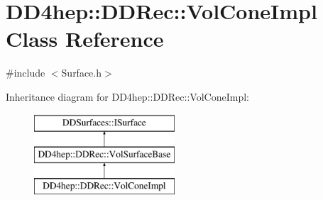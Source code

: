 \hypertarget{class_d_d4hep_1_1_d_d_rec_1_1_vol_cone_impl}{}\section{D\+D4hep\+:\+:D\+D\+Rec\+:\+:Vol\+Cone\+Impl Class Reference}
\label{class_d_d4hep_1_1_d_d_rec_1_1_vol_cone_impl}


{\ttfamily \#include $<$Surface.\+h$>$}

Inheritance diagram for D\+D4hep\+:\+:D\+D\+Rec\+:\+:Vol\+Cone\+Impl\+:\begin{figure}[H]
\begin{center}
\leavevmode
\includegraphics[height=3.000000cm]{class_d_d4hep_1_1_d_d_rec_1_1_vol_cone_impl}
\end{center}
\end{figure}
